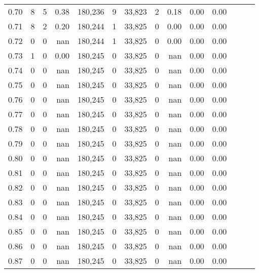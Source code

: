 \begin{tabular}{rrrrrrrrrrrrrr}
0.70 &       8 &      5 &  0.38 &  180,236 &        9 &  33,823 &       2 &  0.18 &  0.00 &      0.00 \\
0.71 &       8 &      2 &  0.20 &  180,244 &        1 &  33,825 &       0 &  0.00 &  0.00 &      0.00 \\
0.72 &       0 &      0 &   nan &  180,244 &        1 &  33,825 &       0 &  0.00 &  0.00 &      0.00 \\
0.73 &       1 &      0 &  0.00 &  180,245 &        0 &  33,825 &       0 &   nan &  0.00 &      0.00 \\
0.74 &       0 &      0 &   nan &  180,245 &        0 &  33,825 &       0 &   nan &  0.00 &      0.00 \\
0.75 &       0 &      0 &   nan &  180,245 &        0 &  33,825 &       0 &   nan &  0.00 &      0.00 \\
0.76 &       0 &      0 &   nan &  180,245 &        0 &  33,825 &       0 &   nan &  0.00 &      0.00 \\
0.77 &       0 &      0 &   nan &  180,245 &        0 &  33,825 &       0 &   nan &  0.00 &      0.00 \\
0.78 &       0 &      0 &   nan &  180,245 &        0 &  33,825 &       0 &   nan &  0.00 &      0.00 \\
0.79 &       0 &      0 &   nan &  180,245 &        0 &  33,825 &       0 &   nan &  0.00 &      0.00 \\
0.80 &       0 &      0 &   nan &  180,245 &        0 &  33,825 &       0 &   nan &  0.00 &      0.00 \\
0.81 &       0 &      0 &   nan &  180,245 &        0 &  33,825 &       0 &   nan &  0.00 &      0.00 \\
0.82 &       0 &      0 &   nan &  180,245 &        0 &  33,825 &       0 &   nan &  0.00 &      0.00 \\
0.83 &       0 &      0 &   nan &  180,245 &        0 &  33,825 &       0 &   nan &  0.00 &      0.00 \\
0.84 &       0 &      0 &   nan &  180,245 &        0 &  33,825 &       0 &   nan &  0.00 &      0.00 \\
0.85 &       0 &      0 &   nan &  180,245 &        0 &  33,825 &       0 &   nan &  0.00 &      0.00 \\
0.86 &       0 &      0 &   nan &  180,245 &        0 &  33,825 &       0 &   nan &  0.00 &      0.00 \\
0.87 &       0 &      0 &   nan &  180,245 &        0 &  33,825 &       0 &   nan &  0.00 &      0.00 \\

\end{tabular}
